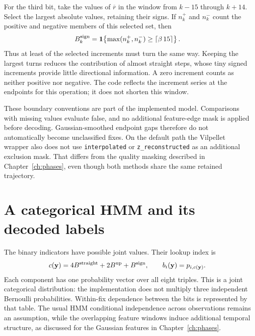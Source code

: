 For the third bit, take the \VilpPersistenceFixes{} values of $\overline r$ in the
window from $k-15$ through $k+14$. Select the \VilpTurnSignSelected{} largest absolute
values, retaining their signs. If $n_k^+$ and $n_k^-$ count the positive and negative
members of this selected set, then
\begin{equation}
 B^{\rm sign}_k=\mathbf 1\!\left\{
 \max(n_k^+,n_k^-)\geq
 \left\lceil\beta\,15\right\rceil\right\}.
 \label{eq:vilpellet-sign}
\end{equation}
Thus at least \VilpTurnSignAgreeing{} of the selected increments must turn the same
way. Keeping the largest turns reduces the contribution of almost straight steps,
whose tiny signed increments provide little directional information. A zero increment
counts as neither positive nor negative. The code reflects the increment series at
the endpoints for this operation; it does not shorten this window.

These boundary conventions are part of the implemented model. Comparisons with
missing values evaluate false, and no additional feature-edge mask is applied before
decoding. Gaussian-smoothed endpoint gaps therefore do not automatically become
unclassified fixes. On the default path the Vilpellet wrapper also does not use
\texttt{interpolated} or \texttt{z\_reconstructed} as an additional exclusion mask.
That differs from the quality masking described in Chapter~\ref{ch:phases}, even
though both methods share the same retained trajectory.

\section{A categorical HMM and its decoded labels}
\label{sec:vilpellet-decoding}
The \VilpFeatureCount{} binary indicators have \VilpObservationValues{} possible
joint values. Their lookup index is
\begin{equation}
 c(\mathbf y)=4B^{\rm straight}+2B^{\rm up}+B^{\rm sign},
 \qquad b_i(\mathbf y)=p_{i,c(\mathbf y)}.
 \label{eq:vilpellet-emission}
\end{equation}
Each component has one probability vector over all eight triples. This is a joint
categorical distribution: the implementation does not multiply three independent
Bernoulli probabilities. Within-fix dependence between the bits is represented by
that table. The usual HMM conditional independence across observations remains an
assumption, while the overlapping feature windows induce additional temporal
structure, as discussed for the Gaussian features in Chapter~\ref{ch:phases}.

